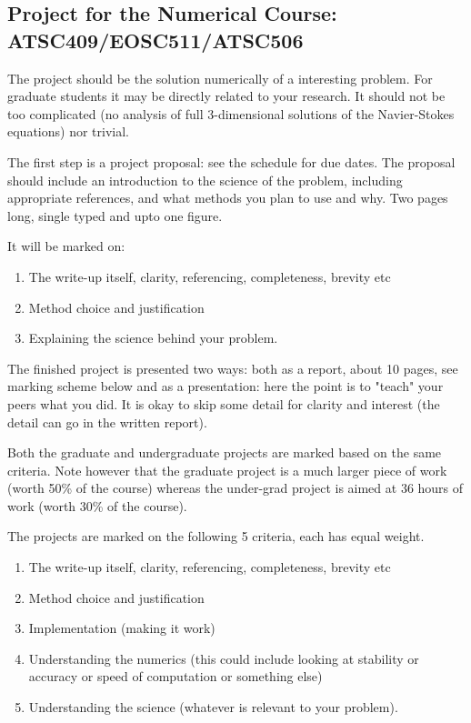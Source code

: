 \documentclass[12pt]{article}
\begin{document}
\subsection*{Project for the Numerical Course: ATSC409/EOSC511/ATSC506}

The project should be the solution numerically of a interesting
problem.  For graduate students it may be directly related to your research.  It should not be too complicated (no analysis of full 3-dimensional solutions of the Navier-Stokes equations) nor trivial.

The first step is a project proposal: see the schedule for due dates. The proposal should include an introduction to the science of the problem, including appropriate references, and what methods you plan to use and why. Two pages long, single typed and upto one figure.

It will be marked on:
\begin{enumerate}
\item The write-up itself, clarity, referencing, completeness, brevity etc
\item Method choice and justification
\item Explaining the science behind your problem.
\end{enumerate}

The finished project is presented two ways:
both as a report, about 10 pages, see marking scheme below and
as a presentation: here the point is to "teach" your peers what you
did.  It is okay to skip some detail for clarity and interest (the detail can go in the written report).

Both the graduate and undergraduate projects are marked based on the
same criteria.  Note however that the graduate project is a much
larger piece of work (worth 50\% of the course) whereas the under-grad
project is aimed at 36 hours of work (worth 30\% of the course).

The projects are marked on the following 5 criteria, each has equal weight.
\begin{enumerate}
\item The write-up itself, clarity, referencing, completeness, brevity
etc
\item Method choice and justification
\item Implementation (making it work)
\item Understanding the numerics  (this could include looking at stability or accuracy or speed of computation or something else)
\item Understanding the science (whatever is
relevant to your problem).
\end{enumerate}
\end{document}
